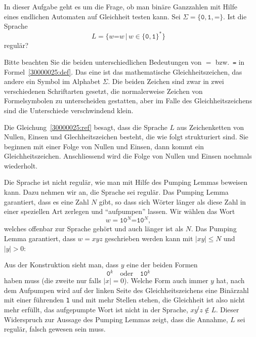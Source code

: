 In dieser Aufgabe geht es um die Frage, ob man binäre Ganzzahlen mit
Hilfe eines endlichen Automaten auf Gleichheit testen kann.
Sei $\Sigma=\{\texttt{0},\texttt{1},\texttt{=}\}$. Ist die Sprache
\begin{equation}
L=\{ w\texttt{=}w\,|\,w\in \{\texttt{0},\texttt{1}\}^*\}
\label{30000025:ref}
\end{equation}
regulär?


\begin{hinweis}
Bitte beachten Sie die beiden unterschiedlichen Bedeutungen von $=$
bzw.~\texttt{=} in Formel~\eqref{30000025:def}.
Das eine ist das mathematische Gleichheitszeichen, das andere ein Symbol
im Alphabet $\Sigma$.
Die beiden Zeichen sind zwar in zwei verschiedenen Schriftarten gesetzt,
die normalerweise Zeichen von Formelsymbolen zu unterscheiden gestatten,
aber im Falle des Gleichheitszeichens sind die Unterschiede verschwindend
klein.

Die Gleichung~\eqref{30000025:ref} besagt, dass die Sprache $L$ aus
Zeichenketten von Nullen, Einsen und Glechheitszeichen besteht, die
wie folgt strukturiert sind.
Sie beginnen mit einer Folge von Nullen und Einsen, dann kommt ein
Gleichheitszeichen.
Anschliessend wird die Folge von Nullen und Einsen nochmals wiederholt.
\end{hinweis}

\begin{loesung}
Die Sprache ist nicht regulär, wie man mit Hilfe des Pumping
Lemmas beweisen kann.
Dazu nehmen wir an, die Sprache sei regulär.
Das Pumping Lemma garantiert, dass es eine Zahl $N$ gibt, so dass
sich Wörter länger als diese Zahl in einer speziellen Art
zerlegen und ``aufpumpen'' lassen.
Wir wählen das Wort
\[
w=\texttt{10}^N\texttt{=10}^N,
\]
welches offenbar zur Sprache gehört und auch länger ist als $N$.
Das Pumping Lemma garantiert, dass $w=xyz$  geschrieben werden kann
mit $|xy|\le N$ und $|y|>0$:
\begin{center}
\end{center}
Aus der Konstruktion sieht man, dass $y$ eine der beiden Formen
\[
\texttt{0}^k
\quad\text{oder}\quad
\texttt{10}^k
\]
haben muss (die zweite nur falls $|x|=0$).
Welche Form auch immer $y$ hat, nach dem Aufpumpen wird
auf der linken Seite des Gleichheitszeichens eine Binärzahl mit
einer führenden \texttt{1} und mit mehr Stellen stehen, die Gleichheit
ist also nicht mehr erfüllt, das aufgepumpte Wort ist nicht in der
Sprache, $xy^lz\not\in L$.
Dieser Widerspruch zur Aussage des Pumping
Lemmas zeigt, dass die Annahme, $L$ sei regulär, falsch gewesen
sein muss.
\end{loesung}


